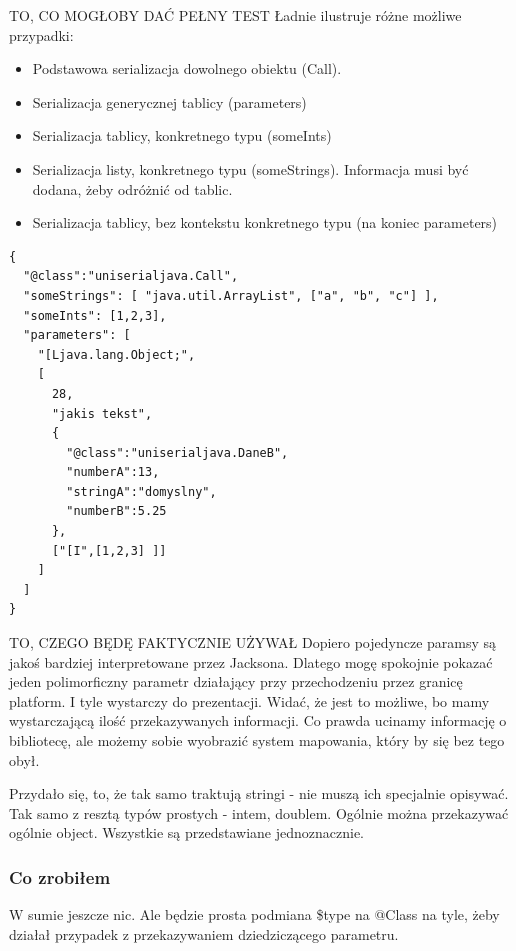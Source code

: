 TO, CO MOGŁOBY DAĆ PEŁNY TEST
Ładnie ilustruje różne możliwe przypadki:
\begin{itemize}
	\item Podstawowa serializacja dowolnego obiektu (Call).
	\item Serializacja generycznej tablicy (parameters)
	\item Serializacja tablicy, konkretnego typu (someInts)
	\item Serializacja listy, konkretnego typu (someStrings). Informacja musi być dodana, żeby odróżnić od tablic.
	\item Serializacja tablicy, bez kontekstu konkretnego typu (na koniec parameters)
\end{itemize}

\begin{lstlisting}[float, frame=single, caption={Jackson daje. Faktyczny test wywołania.}, label=kod:jackson-call-serilization]
{
  "@class":"uniserialjava.Call",
  "someStrings": [ "java.util.ArrayList", ["a", "b", "c"] ],
  "someInts": [1,2,3],
  "parameters": [
    "[Ljava.lang.Object;",
    [
      28,
      "jakis tekst",
      {
        "@class":"uniserialjava.DaneB",
        "numberA":13,
        "stringA":"domyslny",
        "numberB":5.25
      },
      ["[I",[1,2,3] ]]
    ]
  ]
}
\end{lstlisting}

TO, CZEGO BĘDĘ FAKTYCZNIE UŻYWAŁ
Dopiero pojedyncze paramsy są jakoś bardziej interpretowane przez Jacksona. Dlatego mogę spokojnie pokazać jeden polimorficzny parametr działający przy przechodzeniu przez granicę platform. I tyle wystarczy do prezentacji. Widać, że jest to możliwe, bo mamy wystarczającą ilość przekazywanych informacji. Co prawda ucinamy informację o bibliotecę, ale możemy sobie wyobrazić system mapowania, który by się bez tego obył.

Przydało się, to, że tak samo traktują stringi - nie muszą ich specjalnie opisywać. Tak samo z resztą typów prostych - intem, doublem. Ogólnie można przekazywać ogólnie object. Wszystkie są przedstawiane jednoznacznie.

\subsubsection{Co zrobiłem}
W sumie jeszcze nic. Ale będzie prosta podmiana \$type na @Class na tyle, żeby działał przypadek z przekazywaniem dziedziczącego parametru.

